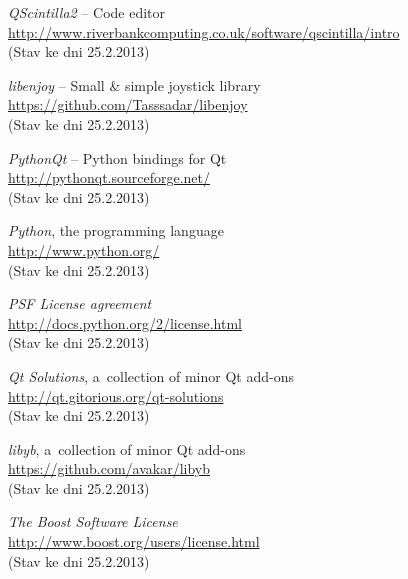 \documentclass[12pt, a4paper, oneside]{article}
\newcommand{\It}{\textit}  %
\begin{document}
\begin{thebibliography}{99}
     \It{QScintilla2} -- Code editor \\
    \url{http://www.riverbankcomputing.co.uk/software/qscintilla/intro}\\
    (Stav ke dni 25.2.2013)

     \It{libenjoy} -- Small & simple joystick library \\
    \url{https://github.com/Tasssadar/libenjoy}\\
    (Stav ke dni 25.2.2013)

     \It{PythonQt} -- Python bindings for Qt \\
    \url{http://pythonqt.sourceforge.net/}\\
    (Stav ke dni 25.2.2013)

     \It{Python}, the programming language \\
    \url{http://www.python.org/}\\
    (Stav ke dni 25.2.2013)

     \It{PSF License agreement} \\
    \url{http://docs.python.org/2/license.html}\\
    (Stav ke dni 25.2.2013)

     \It{Qt Solutions}, a~collection of minor Qt add-ons\\
    \url{http://qt.gitorious.org/qt-solutions}\\
    (Stav ke dni 25.2.2013)

     \It{libyb}, a~collection of minor Qt add-ons\\
    \url{https://github.com/avakar/libyb}\\
    (Stav ke dni 25.2.2013)

     \It{The Boost Software License} \\
    \url{http://www.boost.org/users/license.html}\\
    (Stav ke dni 25.2.2013)

\end{thebibliography}
\end{document}
